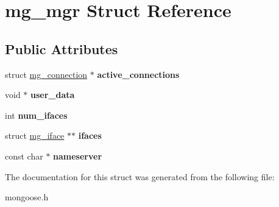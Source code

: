 \hypertarget{structmg__mgr}{}\section{mg\+\_\+mgr Struct Reference}
\label{structmg__mgr}
\subsection*{Public Attributes}
\begin{DoxyCompactItemize}
\item 
\mbox{\label{structmg__mgr_abb2e9f2e7a4851f22e84da9f87d9cca2}} 
struct \hyperlink{structmg__connection}{mg\+\_\+connection} $\ast$ {\bfseries active\+\_\+connections}
\item 
\mbox{\label{structmg__mgr_ac2e8ed98ad341f9f58bfd3add2c6bdc6}} 
void $\ast$ {\bfseries user\+\_\+data}
\item 
\mbox{\label{structmg__mgr_a5354db212e2db2b8e115017ecf1060df}} 
int {\bfseries num\+\_\+ifaces}
\item 
\mbox{\label{structmg__mgr_afd2b46e44b87ffc58a8e286ed784ee31}} 
struct \hyperlink{structmg__iface}{mg\+\_\+iface} $\ast$$\ast$ {\bfseries ifaces}
\item 
\mbox{\label{structmg__mgr_a6177e6c1145fe43e36d7cc926a7f0d8c}} 
const char $\ast$ {\bfseries nameserver}
\end{DoxyCompactItemize}


The documentation for this struct was generated from the following file\+:\begin{DoxyCompactItemize}
\item 
mongoose.\+h\end{DoxyCompactItemize}
